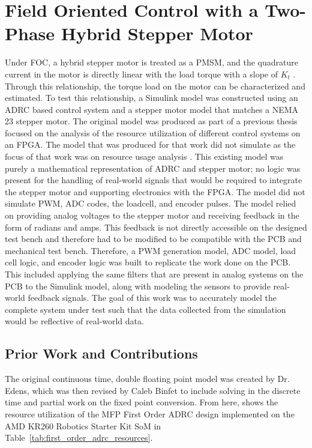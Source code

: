 \chapter{Field Oriented Control with a Two-Phase Hybrid Stepper Motor} \label{CH:FOCStepperMotor}

Under FOC, a hybrid stepper motor is treated as a PMSM, and the quadrature current in the motor is directly linear with the load torque with a slope of $K_t$ \cite{derammelaere_linear_2010,bernardi_performance_2022}. Through this relationship, the torque load on the motor can be characterized and estimated. To test this relationship, a Simulink model was constructed using an ADRC based control system and a stepper motor model that matches a NEMA 23 stepper motor. The original model was produced as part of a previous thesis focused on the analysis of the resource utilization of different control systems on an FPGA. The model that was produced for that work did not simulate as the focus of that work was on resource usage analysis \cite{binfet_implementation_2026}. This existing model was purely a mathematical representation of ADRC and stepper motor; no logic was present for the handling of real-world signals that would be required to integrate the stepper motor and supporting electronics with the FPGA. The model did not simulate PWM, ADC codes, the loadcell, and encoder pulses. The model relied on providing analog voltages to the stepper motor and receiving feedback in the form of radians and amps. This feedback is not directly accessible on the designed test bench and therefore had to be modified to be compatible with the PCB and mechanical test bench. Therefore, a PWM generation model, ADC model, load cell logic, and encoder logic was built to replicate the work done on the PCB. This included applying the same filters that are present in analog systems on the PCB to the Simulink model, along with modeling the sensors to provide real-world feedback signals. The goal of this work was to accurately model the complete system under test such that the data collected from the simulation would be reflective of real-world data.

\section{Prior Work and Contributions}\label{priorWorkAndContributions}

The original continuous time, double floating point model was created by Dr. Edens, which was then revised by Caleb Binfet to include solving in the discrete time and partial work on the fixed point conversion. From here, \cite{binfet_implementation_2026} shows the resource utilization of the MFP First Order ADRC design implemented on the AMD KR260 Robotics Starter Kit SoM in Table~\ref{tab:first_order_adrc_resources}.

